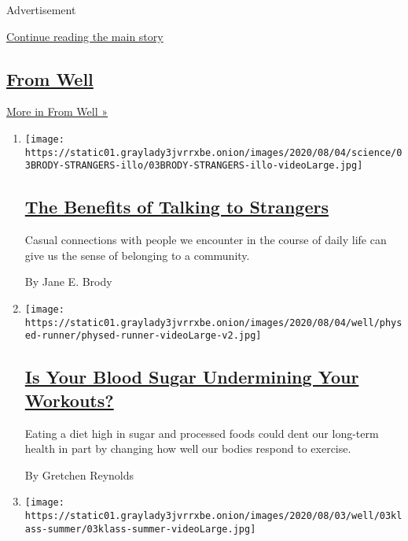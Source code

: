 Advertisement

\protect\hyperlink{after-mid1}{Continue reading the main story}

\hypertarget{from-well}{%
\subsection{\texorpdfstring{\href{/section/well}{From
Well}}{From Well}}\label{from-well}}

\href{/section/well}{More in From Well »}

\begin{enumerate}
\def\labelenumi{\arabic{enumi}.}
\item
  \texttt{[image: https://static01.graylady3jvrrxbe.onion/images/2020/08/04/science/03BRODY-STRANGERS-illo/03BRODY-STRANGERS-illo-videoLarge.jpg]}

  \hypertarget{the-benefits-of-talking-to-strangers}{%
  \subsection{\texorpdfstring{\href{/2020/08/03/well/family/the-benefits-of-talking-to-strangers.html}{The
  Benefits of Talking to
  Strangers}}{The Benefits of Talking to Strangers}}\label{the-benefits-of-talking-to-strangers}}

  Casual connections with people we encounter in the course of daily
  life can give us the sense of belonging to a community.

  By Jane E. Brody
\item
  \texttt{[image: https://static01.graylady3jvrrxbe.onion/images/2020/08/04/well/physed-runner/physed-runner-videoLarge-v2.jpg]}

  \hypertarget{is-your-blood-sugar-undermining-your-workouts}{%
  \subsection{\texorpdfstring{\href{/2020/07/29/well/move/blood-sugar-diet-foods-workouts-exercise-muscles.html}{Is
  Your Blood Sugar Undermining Your
  Workouts?}}{Is Your Blood Sugar Undermining Your Workouts?}}\label{is-your-blood-sugar-undermining-your-workouts}}

  Eating a diet high in sugar and processed foods could dent our
  long-term health in part by changing how well our bodies respond to
  exercise.

  By Gretchen Reynolds
\item
  \texttt{[image: https://static01.graylady3jvrrxbe.onion/images/2020/08/03/well/03klass-summer/03klass-summer-videoLarge.jpg]}


\end{enumerate}
